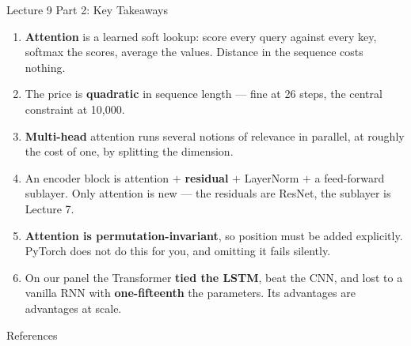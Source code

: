 \documentclass[aspectratio=169, 11pt]{beamer}
\begin{document}
\begin{frame}{Lecture 9 Part 2: Key Takeaways}
  \begin{keybox}
    {\footnotesize
    \begin{enumerate}\itemsep2pt
      \item \textbf{Attention} is a learned soft lookup: score every query against every key,
            softmax the scores, average the values. Distance in the sequence costs nothing.

      \item The price is \textbf{quadratic} in sequence length --- fine at 26 steps, the central
            constraint at 10{,}000.

      \item \textbf{Multi-head} attention runs several notions of relevance in parallel, at
            roughly the cost of one, by splitting the dimension.

      \item An encoder block is attention $+$ \textbf{residual} $+$ LayerNorm $+$ a feed-forward
            sublayer. Only attention is new --- the residuals are ResNet, the sublayer is
            Lecture 7.

      \item \textbf{Attention is permutation-invariant}, so position must be added explicitly.
            PyTorch does not do this for you, and omitting it fails silently.

      \item On our panel the Transformer \textbf{tied the LSTM}, beat the CNN, and lost to a
            vanilla RNN with \textbf{one-fifteenth} the parameters. Its advantages are
            advantages at scale.
    \end{enumerate}
    }
  \end{keybox}
\end{frame}

\begin{frame}[allowframebreaks]{References}
  \printbibliography[heading=none]
\end{frame}
\end{document}

